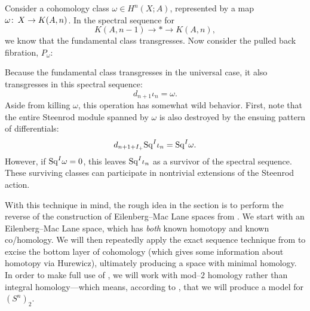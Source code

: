\begin{remark}\label{KillingCohWithExact}
Consider a cohomology class $\omega \in H^n(X; A)$, represented by a map $\omega\colon\thinspace X \to K(A, n)$.
In the spectral sequence for \[K(A, n-1) \to * \to K(A, n),\] we know that the fundamental class transgresses.
Now consider the pulled back fibration, $P_\omega$:
\begin{center}
\end{center}
Because the fundamental class transgresses in the universal case, it also transgresses in this spectral sequence: \[d_{n+1} \iota_n = \omega.\]
Aside from killing $\omega$, this operation has somewhat wild behavior.
First, note that the entire Steenrod module spanned by $\omega$ is also destroyed by the ensuing pattern of differentials: \[d_{n+1+I_+} \mathrm{Sq}^I \iota_n = \mathrm{Sq}^I \omega.\]
However, if $\mathrm{Sq}^I \omega = 0$, this leaves $\mathrm{Sq}^I \iota_n$ as a survivor of the spectral sequence.
These surviving classes can participate in nontrivial extensions of the Steenrod action.
\end{remark}

With this technique in mind, the rough idea in the section is to perform the reverse of the construction of Eilenberg--Mac Lane spaces from .
We start with an Eilenberg--Mac Lane space, which has \emph{both} known homotopy and known co/homology.
We will then repeatedly apply the exact sequence technique from  to excise the bottom layer of cohomology (which gives some information about homotopy via Hurewicz), ultimately producing a space with minimal homology.
In order to make full use of , we will work with mod--$2$ homology rather than integral homology---which means, according to , that we will produce a model for $(S^n)_2$.

